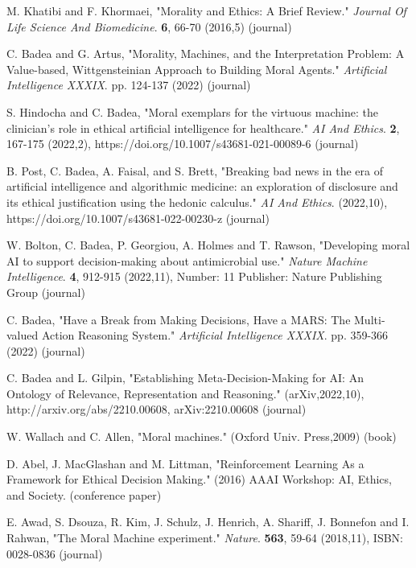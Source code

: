 \documentclass[10pt]{article}
\begin{document}
\def\refname{REFERENCES}

\begin{thebibliography}{1}

M. Khatibi and F. Khormaei, "Morality and Ethics: A Brief Review." {\em Journal Of Life Science And Biomedicine}. \textbf{6}, 66-70 (2016,5) (journal)

C. Badea and G. Artus, "Morality, Machines, and the Interpretation Problem: A Value-based, Wittgensteinian Approach to Building Moral Agents." {\em Artificial Intelligence XXXIX}. pp. 124-137 (2022) (journal)


S. Hindocha and C. Badea, "Moral exemplars for the virtuous machine: the clinician’s role in ethical artificial intelligence for healthcare." {\em AI And Ethics}. \textbf{2}, 167-175 (2022,2), https://doi.org/10.1007/s43681-021-00089-6 (journal)

B. Post, C. Badea, A. Faisal, and S. Brett, "Breaking bad news in the era of artificial intelligence and algorithmic medicine: an exploration of disclosure and its ethical justification using the hedonic calculus." {\em AI And Ethics}. (2022,10), https://doi.org/10.1007/s43681-022-00230-z (journal)

W. Bolton, C. Badea, P. Georgiou, A. Holmes and T. Rawson, "Developing moral AI to support decision-making about antimicrobial use." {\em Nature Machine Intelligence}. \textbf{4}, 912-915 (2022,11), Number: 11 Publisher: Nature Publishing Group (journal)

C. Badea, "Have a Break from Making Decisions, Have a MARS: The Multi-valued Action Reasoning System." {\em Artificial Intelligence XXXIX}. pp. 359-366 (2022) (journal)

C. Badea and L. Gilpin, "Establishing Meta-Decision-Making for AI: An Ontology of Relevance, Representation and Reasoning." (arXiv,2022,10), http://arxiv.org/abs/2210.00608, arXiv:2210.00608 (journal)


W. Wallach and C. Allen, "Moral machines." (Oxford Univ. Press,2009) (book)


D. Abel, J. MacGlashan and M. Littman, "Reinforcement Learning As a Framework for Ethical Decision Making." (2016) AAAI Workshop: AI, Ethics, and Society. (conference paper)


E. Awad, S. Dsouza, R. Kim, J. Schulz, J. Henrich, A. Shariff, J. Bonnefon and I. Rahwan, "The Moral Machine experiment." {\em Nature}. \textbf{563}, 59-64 (2018,11), ISBN: 0028-0836 (journal)


\end{thebibliography}
\end{document}
